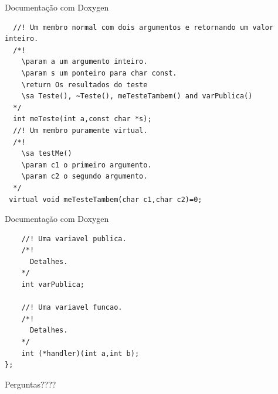 \documentclass[12pt,table,xcolor={dvipsnames}]{beamer}
\begin{document}
\begin{frame}[fragile]{Documentação com Doxygen}
\begin{lstlisting}
  //! Um membro normal com dois argumentos e retornando um valor inteiro.
  /*!
    \param a um argumento inteiro.
    \param s um ponteiro para char const.
    \return Os resultados do teste
    \sa Teste(), ~Teste(), meTesteTambem() and varPublica()
  */
  int meTeste(int a,const char *s);
  //! Um membro puramente virtual.
  /*!
    \sa testMe()
    \param c1 o primeiro argumento.
    \param c2 o segundo argumento.
  */
 virtual void meTesteTambem(char c1,char c2)=0;
\end{lstlisting}
\end{frame}

\begin{frame}[fragile]{Documentação com Doxygen}
\begin{lstlisting}
    //! Uma variavel publica.
    /*!
      Detalhes.
    */
    int varPublica;

    //! Uma variavel funcao.
    /*!
      Detalhes.
    */
    int (*handler)(int a,int b);
};
\end{lstlisting}
\end{frame}

{
\begin{frame}

{\LARGE Perguntas????}

\end{frame}
}
\end{document}
